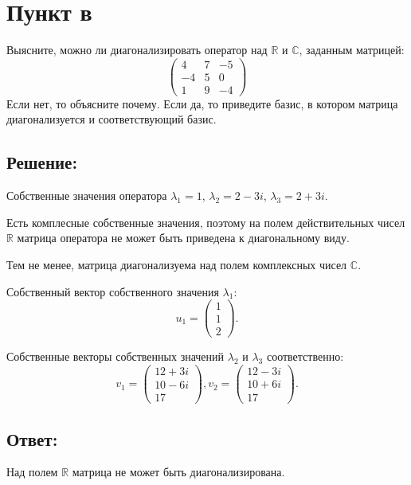 \documentclass[12pt]{article}
\begin{document}
    \section*{Пункт в}
    Выясните, можно ли диагонализировать оператор над $\mathbb{R}$ и $\mathbb{C}$, заданным матрицей:
    \[
        \begin{pmatrix}
            4  & 7 & -5  \\
            -4 & 5 & 0   \\
            1  & 9 & - 4
        \end{pmatrix}
    \]
    Если нет, то объясните почему. Если да, то приведите базис, в котором матрица диагонализуется и соответствующий базис.

    \subsection*{Решение:}
    Собственные значения оператора $\lambda_1 = 1$, $\lambda_2 = 2 - 3i$, $\lambda_3 = 2 + 3i$.

    Есть комплесные собственные значения, поэтому на полем действительных чисел $\mathbb{R}$ матрица оператора не может быть приведена к диагональному виду.

    Тем не менее, матрица диагонализуема над полем комплексных чисел $\mathbb{C}$.

    Собственный вектор собственного значения $\lambda_1$:
    \[
        u_1 = \begin{pmatrix}
                  1 \\ 1 \\ 2
        \end{pmatrix}.
    \]

    Собственные векторы собственных значений $\lambda_2$ и $\lambda_3$ соответственно:
    \[
        v_1 = \begin{pmatrix}
                  12 + 3i \\ 10 - 6i \\ 17
        \end{pmatrix},
        v_2 = \begin{pmatrix}
                  12 - 3i \\ 10 + 6i \\ 17
        \end{pmatrix}.
    \]

    \subsection*{Ответ:}
    Над полем $\mathbb{R}$ матрица не может быть диагонализирована.
\end{document}
